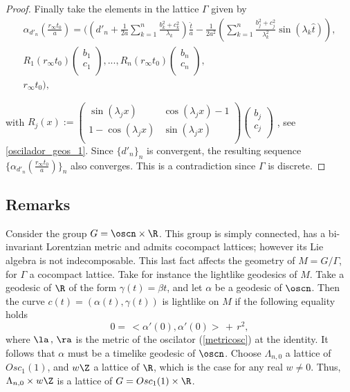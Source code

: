 \documentclass[11pt]{amsart}
\theoremstyle{plain}
\theoremstyle{definition}
\theoremstyle{remark}
\begin{document}
\begin{proof}
			Finally take the elements in the lattice $\Gamma$ given by
			\begin{eqnarray*}
				\alpha_{d'_n}(\frac{r_{\infty} t_0}{a}) = ( (d'_n + \frac{1}{2 a} \sum_{k=1}^{n} \frac{ b_{k}^{2}+c_k^{2}}{\lambda_k})\frac{\hat{t}}{a}- \frac{1}{2 a^{2}} (  \sum_{k=1}^{n} \frac{b_{j}^{2}+c_j^2}{\lambda_k^{2}} \sin(\lambda_k \hat{t}) ), \\ 
				R_1(r_{\infty} t_0)\left( \begin{matrix}
					b_1 \\
					c_1 \\
				\end{matrix} \right),..., R_n(r_{\infty} t_0)\left( \begin{matrix}
					b_n \\
					c_n \\
				\end{matrix} \right), \\     
				r_\infty t_0 ),
			\end{eqnarray*}
			
			with $R_j(x) := \left( \begin{matrix}
				\sin{(\lambda_j x)} & \cos{(\lambda_j x)} -1 \\
				1 - \cos{(\lambda_j x)} & \sin{(\lambda_j x)} \\
			\end{matrix} \right)
			\left( \begin{matrix}
				b_j \\
				c_j \\
			\end{matrix} \right)$ , see \eqref{oscilador_geos_1}. Since $\{d'_n\}_n$ is convergent, the resulting sequence $\{ \alpha_{d'_n}(\frac{r_{\infty} t_0}{a}) \}_n$ also converges. This is a contradiction since $\Gamma$ is discrete.
			
		\end{proof}
		
		
		
	
	\subsection{Remarks}
	Consider the group $G=\oscn \times \R$. This group is simply connected, has a bi-invariant Lorentzian metric and admits cocompact lattices; however its Lie algebra is not indecomposable. This last fact affects the geometry of $M=G/\Gamma$, for $\Gamma$ a cocompact lattice. Take for instance the lightlike geodesics of $M$. Take a geodesic of $\R$ of the form $\gamma(t)=\beta t$, and let $\alpha$ be a geodesic of $\oscn$. Then the curve  $c(t)=(\alpha(t),\gamma(t))$ is lightlike on $M$ if the following equality holds
	\begin{equation}\label{remarkosc}
		0 = \, <\alpha'(0),\alpha'(0)> \, + \, r^2, 
	\end{equation}
	where $\la \,,\,\ra$ is the metric of the oscilator (\ref{metricosc}) at the identity. It follows that $\alpha$ must be a timelike geodesic of $\oscn$. Choose $\Lambda_{n,0}$  a lattice of $Osc_1(1)$, and $w \Z$ a lattice of $\R$, which is the case for any real $w \neq 0$. Thus,  $\Lambda_{n,0} \times w \Z$ is a lattice of $G=Osc_1(1) \times \R$.
	
\end{document}
